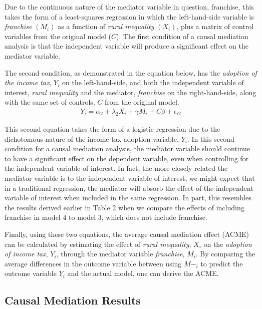 \documentclass[letter, 12pt]{article}
\begin{document}
Due to the continuous nature of the mediator variable in question, franchise, this takes the form of a least-squares regression in which the left-hand-side variable is \emph{franchise} $(M_i)$ as a function of \emph{rural inequality} $(X_i)$, plus a matrix of control variables from the original model ($C$). The first condition of a causal mediation analysis is that the independent variable will produce a significant effect on the mediator variable. 

The second condition, as demonstrated in the equation below, has the \emph{adoption of the income tax}, $Y_i$ on the left-hand-side, and both the independent variable of interest, \emph{rural inequality} and the mediator, \emph{franchise} on the right-hand-side, along with the same set of controls, $C$ from the original model. 
\begin{align}
Y_i = \alpha_2 + \lambda_2X_i + \gamma M_i + C\beta + \epsilon_{i2}
\end{align}

This second equation takes the form of a logistic regression due to the dichotomous nature of the income tax adoption variable, $Y_i$. In this second condition for a causal mediation analysis, the mediator variable should continue to have a significant effect on the dependent variable, even when controlling for the independent variable of interest. In fact, the more closely related the mediator variable is to the independent variable of interest, we might expect that in a traditional regression, the mediator will absorb the effect of the independent variable of interest when included in the same regression. In part, this resembles the results derived earlier in Table 2 when we compare the effects of including franchise in model 4 to model 3, which does not include franchise.

Finally, using these two equations, the average causal mediation effect (ACME) can be calculated by estimating the effect of \emph{rural inequality}, $X_i$ on the \emph{adoption of income tax}, $Y_i$, through the mediator variable \emph{franchise}, $M_i$. By comparing the average differences in the outcome variable between using $M-_i$ to predict the outcome variable $Y_i$ and the actual model, one can derive the ACME. 

\pagebreak

\subsection{Causal Mediation Results}\hfill\\
\end{document}
